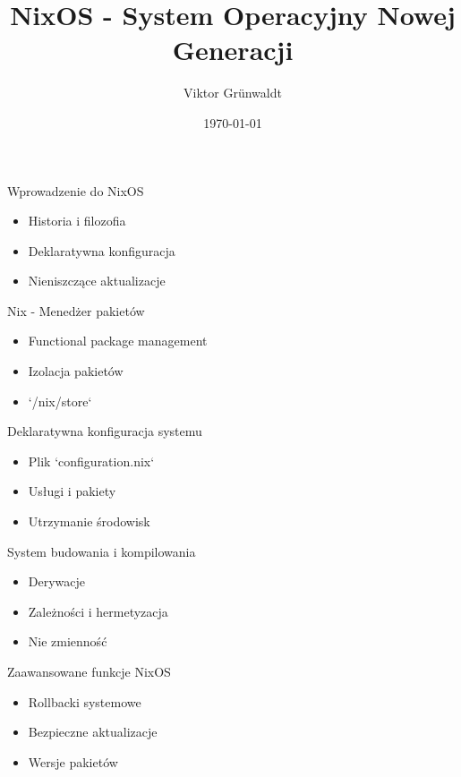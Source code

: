 \documentclass{beamer}
\title{NixOS - System Operacyjny Nowej Generacji}
\author{Viktor Grünwaldt}
\date{\today}
\begin{document}
\begin{frame}
    \titlepage
\end{frame}

\begin{frame}{Wprowadzenie do NixOS}
    \begin{itemize}
        \item Historia i filozofia
        \item Deklaratywna konfiguracja
        \item Nieniszczące aktualizacje
    \end{itemize}
\end{frame}

\begin{frame}{Nix - Menedżer pakietów}
    \begin{itemize}
        \item Functional package management
        \item Izolacja pakietów
        \item `/nix/store`
    \end{itemize}
\end{frame}

\begin{frame}{Deklaratywna konfiguracja systemu}
    \begin{itemize}
        \item Plik `configuration.nix`
        \item Usługi i pakiety
        \item Utrzymanie środowisk
    \end{itemize}
\end{frame}

\begin{frame}{System budowania i kompilowania}
    \begin{itemize}
        \item Derywacje
        \item Zależności i hermetyzacja
        \item Nie zmienność
    \end{itemize}
\end{frame}

\begin{frame}{Zaawansowane funkcje NixOS}
    \begin{itemize}
        \item Rollbacki systemowe
        \item Bezpieczne aktualizacje
        \item Wersje pakietów
    \end{itemize}
\end{frame}
\end{document}
